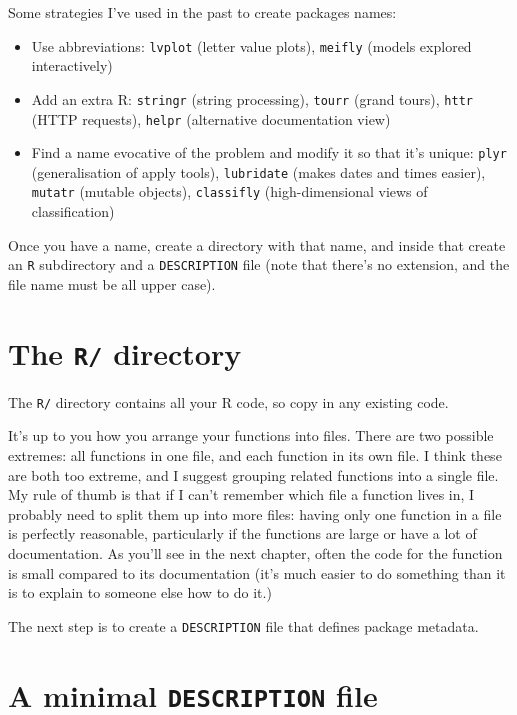 Some strategies I've used in the past to create packages names:

\begin{itemize}
\item
  Use abbreviations: \texttt{lvplot} (letter value plots),
  \texttt{meifly} (models explored interactively)
\item
  Add an extra R: \texttt{stringr} (string processing), \texttt{tourr}
  (grand tours), \texttt{httr} (HTTP requests), \texttt{helpr}
  (alternative documentation view)
\item
  Find a name evocative of the problem and modify it so that it's
  unique: \texttt{plyr} (generalisation of apply tools),
  \texttt{lubridate} (makes dates and times easier), \texttt{mutatr}
  (mutable objects), \texttt{classifly} (high-dimensional views of
  classification)
\end{itemize}

Once you have a name, create a directory with that name, and inside that
create an \texttt{R} subdirectory and a \texttt{DESCRIPTION} file (note
that there's no extension, and the file name must be all upper case).

\section{The \texttt{R/} directory}

The \texttt{R/} directory contains all your R code, so copy in any
existing code.

It's up to you how you arrange your functions into files. There are two
possible extremes: all functions in one file, and each function in its
own file. I think these are both too extreme, and I suggest grouping
related functions into a single file. My rule of thumb is that if I
can't remember which file a function lives in, I probably need to split
them up into more files: having only one function in a file is perfectly
reasonable, particularly if the functions are large or have a lot of
documentation. As you'll see in the next chapter, often the code for the
function is small compared to its documentation (it's much easier to do
something than it is to explain to someone else how to do it.)

The next step is to create a \texttt{DESCRIPTION} file that defines
package metadata.

\section{A minimal \texttt{DESCRIPTION} file}

